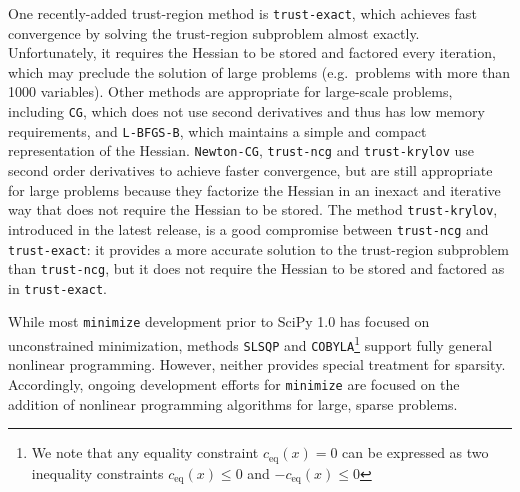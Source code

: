 One recently-added trust-region method is \texttt{trust-exact},
which achieves fast convergence by solving the trust-region subproblem almost exactly.
Unfortunately, it requires the Hessian to be stored and factored every iteration, which may preclude
the solution of large problems (e.g.~problems with more than 1000 variables).
Other methods are appropriate for large-scale problems, including
\texttt{CG}, which does not use second derivatives and thus has low memory requirements, and \texttt{L-BFGS-B}, which maintains a simple and compact representation of the Hessian.
\texttt{Newton-CG}, \texttt{trust-ncg} and \texttt{trust-krylov} use second order derivatives to achieve faster
convergence, but are still appropriate for large problems because they factorize the Hessian in an inexact and iterative way that does not require the Hessian to be stored.
The method \texttt{trust-krylov}, introduced in the latest release, is a good compromise between
\texttt{trust-ncg} and \texttt{trust-exact}: it provides a more accurate solution to the trust-region
subproblem than \texttt{trust-ncg}, but it does not require the Hessian to be stored and factored as in \texttt{trust-exact}.

While most \texttt{minimize} development prior to SciPy 1.0 has focused on unconstrained minimization, methods \texttt{SLSQP} and \texttt{COBYLA}\footnote{We note that any equality constraint $c_{\text{eq}}(x) = 0$ can be expressed as two inequality constraints $c_{\text{eq}}(x) \leq 0$ and $-c_{\text{eq}}(x) \leq 0$} support fully general nonlinear programming. However, neither provides special treatment for sparsity. Accordingly, ongoing development efforts for \texttt{minimize} are focused on the addition of nonlinear programming algorithms for large, sparse problems. 

